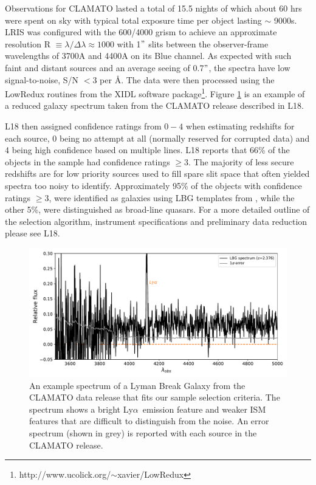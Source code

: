 \documentclass[twocolumn,tight,times]{aastex63}
\newcommand{\lya}{Ly$\alpha$}
\begin{document}
Observations for CLAMATO lasted a total of 15.5 nights of which about 60 hrs were spent on sky with typical total exposure time per object lasting $\sim$ 9000s. LRIS was configured with the 600/4000 grism to achieve an approximate resolution R $\equiv \lambda/\Delta\lambda \approx 1000$ with 1$"$ slits between the observer-frame wavelengths of 3700A and 4400A on its Blue channel. As expected with such faint and distant sources and an average seeing of 0.7$"$, the spectra have low signal-to-noise, S/N $< 3$ per \AA. The data were then processed using the LowRedux routines from the XIDL software package\footnote{http://www.ucolick.org/$\sim$xavier/LowRedux}. Figure \ref{fig:exspec} is an example of a reduced galaxy spectrum taken from the CLAMATO release described in L18. 

L18 then assigned confidence ratings from $0-4$ when estimating redshifts for each source, 0 being no attempt at all (normally reserved for corrupted data) and 4 being high confidence based on multiple lines. L18 reports that 66\% of the objects in the sample had confidence ratings $\geq 3$. The majority of less secure redshifts are for low priority sources used to fill spare slit space that often yielded spectra too noisy to identify. Approximately 95\% of the objects with confidence ratings $\geq 3$, were identified as galaxies using LBG templates from \cite{Shapley_2003}, while the other 5\%, were distinguished as broad-line quasars. For a more detailed outline of the selection algorithm, instrument specifications and preliminary data reduction please see L18. 


\begin{figure}[ht]
    \begin{center}
    \includegraphics[scale=.5]{exspec.pdf}
    \caption{An example spectrum of a Lyman Break Galaxy from the CLAMATO data release that fits our sample selection criteria. The spectrum shows a bright \lya\ emission feature and weaker ISM features that are difficult to distinguish from the noise. An error spectrum (shown in grey) is reported with each source in the CLAMATO release.}
    \label{fig:exspec}
    \end{center}
\end{figure}
\end{document}
